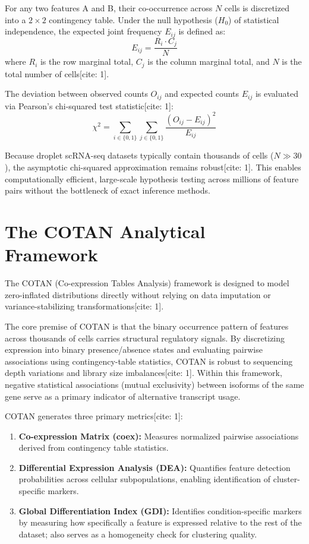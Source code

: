 For any two features A and B, their co-occurrence across $N$ cells is discretized into a $2\times2$ contingency table. Under the null hypothesis ($H_0$) of statistical independence, the expected joint frequency $E_{ij}$ is defined as:
$$E_{ij} = \frac{R_i \cdot C_j}{N}$$
where $R_i$ is the row marginal total, $C_j$ is the column marginal total, and $N$ is the total number of cells[cite: 1].

The deviation between observed counts $O_{ij}$ and expected counts $E_{ij}$ is evaluated via Pearson's chi-squared test statistic[cite: 1]:
$$\chi^2 = \sum_{i\in\{0,1\}} \sum_{j\in\{0,1\}} \frac{(O_{ij} - E_{ij})^2}{E_{ij}}$$

Because droplet scRNA-seq datasets typically contain thousands of cells ($N \gg 30$), the asymptotic chi-squared approximation remains robust[cite: 1]. This enables computationally efficient, large-scale hypothesis testing across millions of feature pairs without the bottleneck of exact inference methods.

\section{The COTAN Analytical Framework}
The COTAN (Co-expression Tables Analysis) framework is designed to model zero-inflated distributions directly without relying on data imputation or variance-stabilizing transformations[cite: 1].

The core premise of COTAN is that the binary occurrence pattern of features across thousands of cells carries structural regulatory signals. By discretizing expression into binary presence/absence states and evaluating pairwise associations using contingency-table statistics, COTAN is robust to sequencing depth variations and library size imbalances[cite: 1]. Within this framework, negative statistical associations (mutual exclusivity) between isoforms of the same gene serve as a primary indicator of alternative transcript usage.

COTAN generates three primary metrics[cite: 1]:
\begin{enumerate}
    \item \textbf{Co-expression Matrix (coex):} Measures normalized pairwise associations derived from contingency table statistics.
    
    \item \textbf{Differential Expression Analysis (DEA):} Quantifies feature detection probabilities across cellular subpopulations, enabling identification of cluster-specific markers.
    
    \item \textbf{Global Differentiation Index (GDI):} Identifies condition-specific markers by measuring how specifically a feature is expressed relative to the rest of the dataset; also serves as a homogeneity check for clustering quality.
\end{enumerate}

